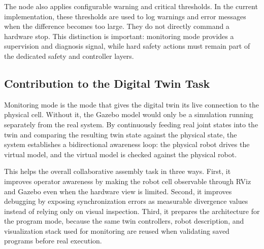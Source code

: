 The node also applies configurable warning and critical thresholds. In the current implementation, these thresholds are used to log warnings and error messages when the difference becomes too large. They do not directly command a hardware stop. This distinction is important: monitoring mode provides a supervision and diagnosis signal, while hard safety actions must remain part of the dedicated safety and controller layers.

\subsection{Contribution to the Digital Twin Task}

Monitoring mode is the mode that gives the digital twin its live connection to the physical cell. Without it, the Gazebo model would only be a simulation running separately from the real system. By continuously feeding real joint states into the twin and comparing the resulting twin state against the physical state, the system establishes a bidirectional awareness loop: the physical robot drives the virtual model, and the virtual model is checked against the physical robot.

This helps the overall collaborative assembly task in three ways. First, it improves operator awareness by making the robot cell observable through RViz and Gazebo even when the hardware view is limited. Second, it improves debugging by exposing synchronization errors as measurable divergence values instead of relying only on visual inspection. Third, it prepares the architecture for the program mode, because the same twin controllers, robot description, and visualization stack used for monitoring are reused when validating saved programs before real execution.

